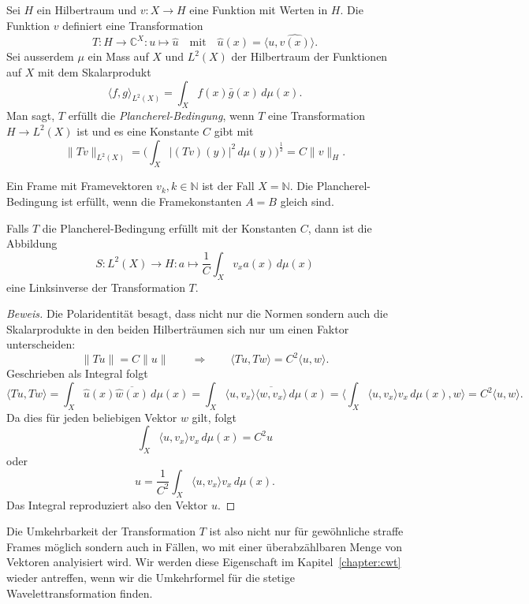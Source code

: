 \begin{definition}
Sei $H$ ein Hilbertraum und
$v\colon X\to H$ eine Funktion mit Werten in $H$.
Die Funktion $v$ definiert eine Transformation
\[
T\colon  H \to \mathbb C^X : u \mapsto \hat{u}
\quad\text{mit}\quad
\hat{u}(x) = \langle u,\hat{v(x)}\rangle.
\]
Sei ausserdem $\mu$ ein Mass auf $X$ und $L^2(X)$ der Hilbertraum
der Funktionen auf $X$ mit dem Skalarprodukt
\[
\langle f,g\rangle_{L^2(X)} = \int_X f(x) \bar{g}(x)\,d\mu(x).
\]
Man sagt, $T$ erfüllt die {\em Plancherel-Bedingung}, wenn $T$
%
eine Transformation $H\to L^2(X)$ ist und es eine Konstante $C$
gibt mit
\[
\| Tv \|_{L^2(X)}
=
\biggl(
\int_{X} |(Tv)(y)|^2 \, d\mu(y)
\biggr)^{\frac12}
=
C \|v\|_H.
\]
\end{definition}

Ein Frame mit Framevektoren $v_k, k\in\mathbb N$ 
ist der Fall $X=\mathbb N$. Die Plancherel-Bedingung ist erfüllt, wenn
die Framekonstanten $A=B$ gleich sind.

\begin{satz}
\label{satz:plancherel-prinzip}
Falls $T$ die Plancherel-Bedingung erfüllt mit der Konstanten $C$, dann ist
die Abbildung
\[
S
\colon
L^2(X) \to H
:
a \mapsto \frac{1}{C}\int_X v_x a(x) \,d\mu(x)
\]
eine Linksinverse der Transformation $T$.
\end{satz}

\begin{proof}[Beweis]
Die Polaridentität besagt, dass nicht nur die Normen sondern auch die
Skalarprodukte in den beiden Hilberträumen sich nur um einen Faktor
unterscheiden:
\[
\| Tu \| = C \| u \|
\qquad\Rightarrow\qquad
\langle Tu,Tw\rangle = C^2 \langle u,w\rangle.
\]
Geschrieben als Integral folgt
\[
\langle Tu,Tw\rangle
=
\int_X \hat{u}(x) \overline{\hat{w}(x)} \,d\mu(x)
=
\int_X \langle u,v_x\rangle \overline{\langle w,v_x\rangle}\,d\mu(x)
=
\biggl\langle
\int_X \langle u,v_x\rangle v_x\,d\mu(x),
w
\biggr\rangle
=
C^2
\langle u,w\rangle.
\]
Da dies für jeden beliebigen Vektor $w$ gilt, folgt 
\[
\int_X \langle u,v_x\rangle v_x\,d\mu(x) = C^2 u
\]
oder
\[
u = \frac{1}{C^2}\int_X \langle u,v_x\rangle v_x\,d\mu(x).
\]
Das Integral reproduziert also den Vektor $u$.
\end{proof}

Die Umkehrbarkeit der Transformation $T$ ist also nicht nur für gewöhnliche
straffe Frames möglich sondern auch in Fällen, wo mit einer überabzählbaren
Menge von Vektoren analyisiert wird.
Wir werden diese Eigenschaft im Kapitel~\ref{chapter:cwt} wieder antreffen,
wenn wir die Umkehrformel für die stetige Wavelettransformation finden.





